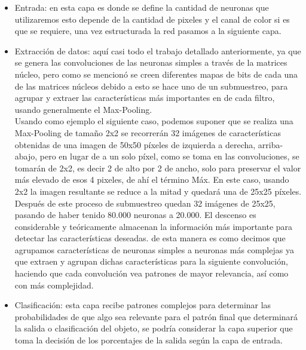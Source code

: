 \documentclass[a4paper, 12pt]{article}
\begin{document}
    \begin{itemize} 
        \item Entrada: en esta capa es donde se define la cantidad de neuronas que utilizaremos esto depende de la cantidad de pixeles y el canal de color si es que se requiere, una vez estructurada la red pasamos a la siguiente capa.  

        \item Extracción de datos: aquí casi todo el trabajo detallado anteriormente, ya que se genera las convoluciones de las neuronas simples a través de la matrices núcleo, pero como se mencionó se creen diferentes mapas de bits de cada una de las matrices núcleos debido a esto se hace uno de un submuestreo, para agrupar y extraer las características más importantes en de cada filtro, usando generalmente el Max-Pooling.\\ 
        Usando como ejemplo el siguiente caso, podemos suponer que se realiza una Max-Pooling de tamaño 2x2 se recorrerán 32 imágenes de características obtenidas de una imagen de 50x50 píxeles de izquierda a derecha, arriba-abajo, pero en lugar de a un solo píxel, como se toma en las convoluciones, se tomarán de 2x2, es decir 2 de alto por 2 de ancho, solo para preservar el valor más elevado de esos 4 pixeles, de ahí el término Máx. En este caso, usando 2x2 la imagen resultante se reduce a la mitad y quedará una de 25x25 píxeles. Después de este proceso de submuestreo quedan 32 imágenes de 25x25, pasando de haber tenido 80.000 neuronas a 20.000. El descenso es considerable y teóricamente almacenan la información más importante para detectar las características deseadas. de esta manera es como decimos que agrupamos características de neuronas simples a neuronas más complejas ya que extraen y agrupan dichas características para la siguiente convolución, haciendo que cada convolución vea patrones de mayor relevancia, así como con más complejidad.  

        \item Clasificación: esta capa recibe patrones complejos para determinar las probabilidades de que algo sea relevante para el patrón final que determinará la salida o clasificación del objeto, se podría considerar la capa superior que toma la decisión de los porcentajes de la salida según la capa de entrada.  
    \end{itemize} 
\end{document}
